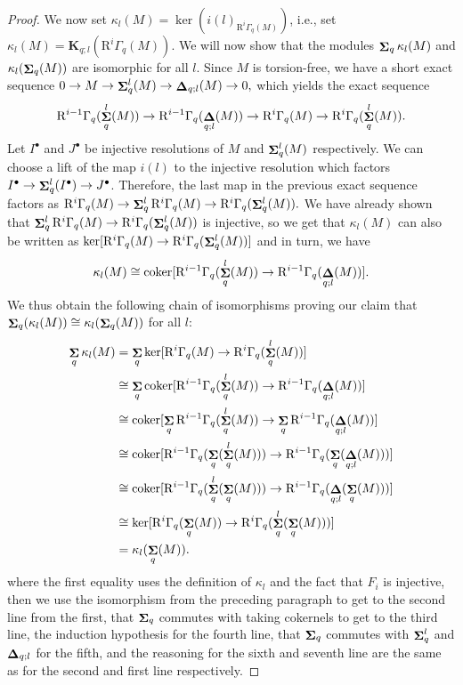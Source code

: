 \documentclass[12pt]{amsart}
\newcommand{\bK}{\mathbf{K}}
\newcommand{\rR}{\mathrm{R}}
\DeclareMathOperator{\coker}{coker}
\DeclareMathOperator{\Sh}{\bf{\Sigma}}
\DeclareMathOperator{\De}{\bf{\Delta}}
\newcommand{\mShq}{\Sh_{q}}
\newcommand{\mKql}{\bK_{q;l}}
\newcommand{\mGaq}{\Gamma_{q}}
\newcommand{\mDel}{\De_{q;l}}
\numberwithin{equation}{section}
\theoremstyle{definition}
\theoremstyle{plain}
\begin{document}
\begin{proof}
We now set $\kappa_l(M) = \ker(i(l)_{\rR^i \mGaq(M)})$, i.e., set $\kappa_l(M) = \mKql(\rR^i\mGaq(M))$. We will now show that the modules $\mShq\kappa_l(M)$ and $\kappa_l(\mShq(M))$ are isomorphic for all $l$. Since $M$ is torsion-free, we have a short exact sequence $0 \to M \to \mShq^l(M) \to \mDel(M) \to 0,$
  which yields the exact sequence
 \begin{displaymath}
 \rR^{i-1}\mGaq(\mShq^l(M)) \to \rR^{i-1}\mGaq(\mDel(M)) \to \rR^i \mGaq(M) \to \rR^i \mGaq(\mShq^l(M)).
  \end{displaymath}
 {Let $I^{\bullet}$ and $J^{\bullet}$ be injective resolutions of $M$ and $\mShq^l(M)$ respectively}. We can choose a lift of the map $i(l)$ to the injective resolution which factors $I^{\bullet} \to \mShq^l(I^{\bullet}) \to J^{\bullet}$. Therefore, the last map in the previous exact sequence factors as
 $\rR^i \mGaq(M) \to \mShq^l \rR^i \mGaq(M) \to \rR^i \mGaq(\mShq^l(M)).$ 
 We have already shown that $\mShq^l \rR^i \mGaq(M) \to \rR^i\mGaq(\mShq^l(M))$ is injective, so we get that $\kappa_l(M)$ can also be written as $\ker[\rR^i \mGaq(M) \to \rR^i\mGaq (\mShq^l(M))]$ and in turn, we have
 \begin{displaymath}
 \kappa_l(M) \cong \coker[\rR^{i-1} \mGaq (\mShq^l(M)) \to \rR^{i-1} \mGaq(\mDel (M))].
 \end{displaymath}
We thus obtain the following chain of isomorphisms proving our claim that $\mShq(\kappa_l(M)) \cong \kappa_l(\mShq(M))$ for all $l$:
 \begin{align*}
\mShq \kappa_l(M) & = \mShq \ker[\rR^i\mGaq(M) \to \rR^i\mGaq(\mShq^l(M))] \\
&\cong \mShq \coker[\rR^{i-1} \mGaq (\mShq^l(M)) \to \rR^{i-1} \mGaq(\mDel (M))] \\
&\cong \coker[\mShq \rR^{i-1} \mGaq (\mShq^l(M)) \to \mShq\rR^{i-1}\mGaq(\mDel(M))] \\
&\cong \coker[\rR^{i-1} \mGaq (\mShq(\mShq^l(M))) \to \rR^{i-1}\mGaq(\mShq(\mDel(M))) ]\\
&\cong \coker[\rR^{i-1} \mGaq (\mShq^l(\mShq(M))) \to \rR^{i-1}\mGaq(\mDel(\mShq(M))) ]\\
&\cong \ker[\rR^i\mGaq(\mShq(M)) \to \rR^i\mGaq(\mShq^l(\mShq(M)))] \\
&= \kappa_l(\mShq(M)).
 \end{align*}
  where
  the first equality uses the definition of $\kappa_l$ and the fact that $F_i$ is injective, then we use the isomorphism from the preceding paragraph
  to get to the second line from the first, that $\mShq$ commutes with taking cokernels to get to the third line, the induction hypothesis for the fourth line, that $\mShq$ commutes with $\mShq^l$ and $\mDel$ for the fifth, and the reasoning for the sixth and seventh line are the same as for the second and first line respectively.
 

\end{proof}
\end{document}

